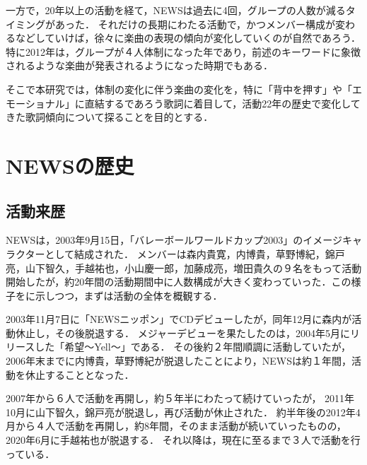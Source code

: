 一方で，20年以上の活動を経て，NEWSは過去に4回，グループの人数が減るタイミングがあった．
それだけの長期にわたる活動で，かつメンバー構成が変わるなどしていけば，徐々に楽曲の表現の傾向が変化していくのが自然であろう．特に2012年は，グループが４人体制になった年であり，前述のキーワードに象徴されるような楽曲が発表されるようになった時期でもある．

そこで本研究では，体制の変化に伴う楽曲の変化を，特に「背中を押す」や「エモーショナル」に直結するであろう歌詞に着目して，活動22年の歴史で変化してきた歌詞傾向について探ることを目的とする．

\section{NEWSの歴史}\label{sec:news-history}

\subsection{活動来歴}
NEWSは，2003年9月15日，「バレーボールワールドカップ2003」のイメージキャラクターとして結成された．
メンバーは森内貴寛，内博貴，草野博紀，錦戸亮，山下智久，手越祐也，小山慶一郎，加藤成亮，増田貴久の９名をもって活動開始したが，約20年間の活動期間中に人数構成が大きく変わっていった．この様子をに示しつつ，まずは活動の全体を概観する．

2003年11月7日に「NEWSニッポン\cite{NEWSnippon}」でCDデビューしたが，同年12月に森内が活動休止し，その後脱退する．
メジャーデビューを果たしたのは，2004年5月にリリースした「希望〜Yell〜」である．
その後約２年間順調に活動していたが，2006年末までに内博貴，草野博紀が脱退したことにより，NEWSは約１年間，活動を休止することとなった．

2007年から６人で活動を再開し，約５年半にわたって続けていったが，
2011年10月に山下智久，錦戸亮が脱退し，再び活動が休止された．
約半年後の2012年4月から４人で活動を再開し，約8年間，そのまま活動が続いていったものの，2020年6月に手越祐也が脱退する．
それ以降は，現在に至るまで３人で活動を行っている．

